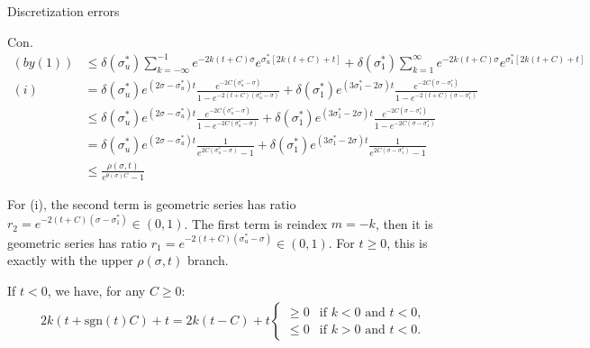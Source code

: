 \documentclass{beamer}
\begin{document}
\begin{frame}{Discretization errors}


    {\footnotesize \scriptsize
    \par Con.
    \begin{align*}
        (by (1)) &\leq \delta(\sigma_{u}^{*}) \sum_{k=-\infty}^{-1} e^{-2k(t+C)\sigma} e^{\sigma_{u}^{*}[2k(t+C)+t]} 
        + \delta(\sigma_{1}^{*}) \sum_{k=1}^{\infty} e^{-2k(t+C)\sigma} e^{\sigma_{1}^{*}[2k(t+C)+t]}\\
        (i)&= \delta(\sigma_{u}^{*}) e^{(2\sigma - \sigma_{u}^{*})t} \frac{e^{-2C(\sigma_{u}^{*}-\sigma)}}{1 - e^{-2(t+C)(\sigma_{u}^{*}-\sigma)}} 
        + \delta(\sigma_{1}^{*}) e^{(3\sigma_{1}^{*}-2\sigma)t} \frac{e^{-2C(\sigma - \sigma_{1}^{*})}}{1 - e^{-2(t+C)(\sigma - \sigma_{1}^{*})}}\\
        & \leq \delta(\sigma_{u}^{*}) e^{(2\sigma - \sigma_{u}^{*})t} \frac{e^{-2C(\sigma_{u}^{*}-\sigma)}}{1 - e^{-2C(\sigma_{u}^{*}-\sigma)}} 
        + \delta(\sigma_{1}^{*}) e^{(3\sigma_{1}^{*}-2\sigma)t} \frac{e^{-2C(\sigma - \sigma_{1}^{*})}}{1 - e^{-2C(\sigma - \sigma_{1}^{*})}}\\
        & = \delta(\sigma_{u}^{*}) e^{(2\sigma - \sigma_{u}^{*})t} \frac{1}{e^{2C(\sigma_{u}^{*}-\sigma)} - 1} 
        + \delta(\sigma_{1}^{*}) e^{(3\sigma_{1}^{*}-2\sigma)t} \frac{1}{e^{2C(\sigma - \sigma_{1}^{*})} - 1}\\
        &\leq \frac{\rho(\sigma, t)}{e^{\theta(\sigma)C} - 1}
    \end{align*}
    \par For (i), the second term is geometric series has ratio \( r_2 = e^{-2(t+C)(\sigma - \sigma_1^*)} \in (0, 1) \). The first term is reindex $m = -k$, 
    then it is geometric series has ratio \( r_1 = e^{-2(t+C)(\sigma_{u}^{*}- \sigma)} \in (0, 1) \). For $t\geq0$, 
    this is exactly with the upper $\rho(\sigma,t)$ branch.
        \par If \( t < 0 \), we have, for any \( C \geq 0 \):
    \begin{align*}
        2k(t + \text{sgn}(t)C) + t = 2k(t - C) + t 
        \begin{cases} 
        \geq 0 & \text{if } k < 0 \text{ and } t < 0, \\ 
        \leq 0 & \text{if } k > 0 \text{ and } t < 0.
        \end{cases}
    \end{align*}
    }
    
\end{frame}
\end{document}
